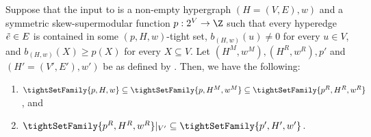 \begin{lemma}\label{lem:WeakToStrongCover:TightSetFamiliesDuringAlgorithm}
Suppose that the input to  is a non-empty hypergraph $(H = (V, E), w)$ and a symmetric skew-supermodular function $p:2^V\rightarrow \Z$ %
such that every hyperedge $\Tilde{e} \in E$ is contained in some $(p, H, w)$-tight set, $b_{(H,w)}(u) \not = 0$ for every $u \in V$, and $b_{(H,w)}(X) \geq p(X)$ for every $X \subseteq V$. 
Let $(H^M, w^M), (H^R, w^R), p'$ 
and $(H' = (V', E'), w')$ be as defined by .
Then, we have the following:
     \begin{enumerate}
        \item $\tightSetFamily{p, H, w} \subseteq \tightSetFamily{p, H^M, w^M} \subseteq \tightSetFamily{p^R, H^R, w^R}$, and 
        \item $\tightSetFamily{p^R, H^R, w^R}|_{V'} \subseteq \tightSetFamily{p', H', w'}$.
    \end{enumerate}
\end{lemma}
